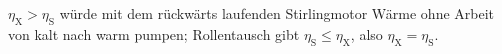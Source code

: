 $\eta_\text{X} > \eta_\text{S}$ würde mit dem rückwärts laufenden Stirlingmotor Wärme ohne Arbeit von kalt nach warm pumpen; Rollentausch gibt $\eta_\text{S} \leq \eta_\text{X}$, also $\eta_\text{X} = \eta_\text{S}$.

